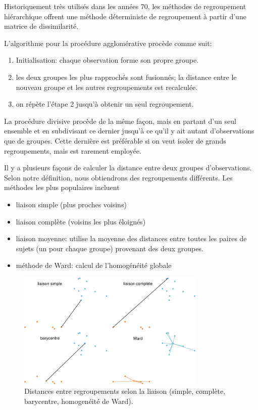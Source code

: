 \documentclass[
  11pt,
  letterpaper,
]{scrbook}
\providecommand{\tightlist}{%
  \setlength{\itemsep}{0pt}\setlength{\parskip}{0pt}}\usepackage{longtable,booktabs,array}
\theoremstyle{definition}
\theoremstyle{remark}
\begin{document}
Historiquement très utilisés dans les années 70, les méthodes de
regroupement hiérarchique offrent une méthode déterministe de
regroupement à partir d'une matrice de dissimilarité.

L'algorithme pour la procédure agglomérative procède comme suit:

\begin{enumerate}
\def\labelenumi{\arabic{enumi}.}
\tightlist
\item
  Initialisation: chaque observation forme son propre groupe.
\item
  les deux groupes les plus rapprochés sont fusionnés; la distance entre
  le nouveau groupe et les autres regroupements est recalculée.
\item
  on répète l'étape 2 jusqu'à obtenir un seul regroupement.
\end{enumerate}

La procédure divisive procède de la même façon, mais en partant d'un
seul ensemble et en subdivisant ce dernier jusqu'à ce qu'il y ait autant
d'observations que de groupes. Cette dernière est préférable si on veut
isoler de grands regroupements, mais est rarement employée.

Il y a plusieurs façons de calculer la distance entre deux groupes
d'observations. Selon notre définition, nous obtiendrons des
regroupements différents. Les méthodes les plus populaires incluent

\begin{itemize}
\tightlist
\item
  liaison simple (plus proches voisins)
\item
  liaison complète (voisins les plus éloignés)
\item
  liaison moyenne: utilise la moyenne des distances entre toutes les
  paires de sujets (un pour chaque groupe) provenant des deux groupes.
\item
  méthode de Ward: calcul de l'homogénéité globale
\end{itemize}

\begin{figure}[ht!]

{\centering \includegraphics[width=0.8\textwidth,height=\textheight]{./03-regroupements_files/figure-pdf/fig-distances-1.pdf}

}

\caption{\label{fig-distances}Distances entre regroupements selon la
liaison (simple, complète, barycentre, homogenéité de Ward).}

\end{figure}
\end{document}
